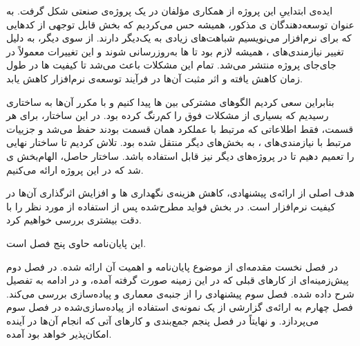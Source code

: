 ایده‌ی ابتداییِ این پروژه از همکاری مؤلفان در یک پروژه‌ی صنعتی شکل گرفت. به عنوان توسعه‌دهندگان ‌ی مذکور، همیشه حس می‌کردیم که بخش قابل توجهی از کدهایی که برای  نرم‌افزار می‌نویسیم شباهت‌های زیادی به یک‌دیگر دارند.
از سوی دیگر، به دلیل تغییر نیازمندی‌های ، همیشه لازم بود تا ‌ها به‌روزرسانی شوند و این تغییرات معمولاً در جای‌جای پروژه منتشر می‌شد. تمام این مشکلات باعث می‌شد تا کیفیت ‌ها در طول زمان کاهش یافته و اثر مثبت آن‌ها در فرآیند توسعه‌ی نرم‌افزار کاهش یابد.

بنابراین سعی کردیم الگوهای مشترکی بین ‌ها پیدا کنیم و با
 مکرر آن‌ها به ساختاری رسیدیم که بسیاری از مشکلات فوق
را کم‌رنگ کرده بود. در این ساختار، برای  هر قسمت، فقط
اطلاعاتی که مرتبط با عملکرد همان قسمت بودند حفظ می‌شد و جزییات مرتبط با
نیازمندی‌های ، به بخش‌های دیگر منتقل شده بود. تلاش کردیم تا
ساختار نهایی را تعمیم دهیم تا در پروژه‌های دیگر نیز قابل استفاده
باشد. ساختار حاصل، الهام‌بخش  ی شد که در این
پروژه ارائه می‌کنیم.

هدف اصلی از ارائه‌ی   پیشنهادی، کاهش هزینه‌ی نگهداری ها و افزایش اثرگذاری آن‌ها در کیفیت نرم‌افزار است. در بخش  فواید مطرح‌شده پس از استفاده از  مورد نظر را با دقت بیشتری بررسی خواهیم کرد.


این پایان‌نامه حاوی پنج فصل است.

در فصل نخست مقدمه‌ای از موضوع پایان‌نامه و اهمیت آن ارائه شده. در فصل دوم پیش‌زمینه‌ای از کارهای قبلی که در این زمینه صورت گرفته آمده، و در ادامه  به تفصیل شرح داده شده. فصل سوم   پیشنهادی را از جنبه‌ی معماری و پیاده‌سازی بررسی می‌کند. فصل چهارم به ارائه‌ی گزارشی از یک نمونه‌ی استفاده از  پیاده‌سازی‌شده در فصل سوم می‌پردازد. و نهایتاً در فصل پنجم جمع‌بندی و کارهای آتی که انجام آن‌ها در آینده امکان‌پذیر خواهد بود آمده.

